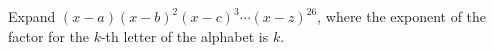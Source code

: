 Expand $(x-a)(x-b)^2(x-c)^3\cdots(x-z)^{26}$, where the exponent of the factor for the $k$-th letter of the alphabet is $k$.
